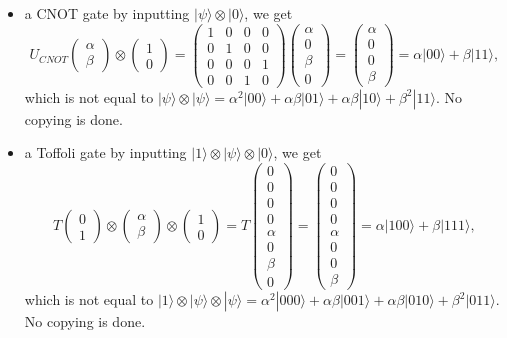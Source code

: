 \documentclass{article}
\theoremstyle{definition}
\begin{document}
\begin{itemize}
  \item a CNOT gate by inputting $|\psi \rangle \otimes |0\rangle$, we get
    \[U_{CNOT} \begin{pmatrix} \alpha \\ \beta \end{pmatrix} \otimes \begin{pmatrix} 1 \\ 0 \end{pmatrix} = \begin{pmatrix} 1&0&0&0\\0&1&0&0\\0&0&0&1\\0&0&1&0 \end{pmatrix} \begin{pmatrix} \alpha \\ 0 \\ \beta \\ 0 \end{pmatrix} = \begin{pmatrix} \alpha \\ 0 \\ 0 \\ \beta \end{pmatrix} = \alpha |00\rangle + \beta |11\rangle,\]
    which is not equal to $|\psi \rangle \otimes |\psi \rangle = \alpha^2 |00\rangle + \alpha \beta |01 \rangle + \alpha \beta |10 \rangle + \beta^2 |11 \rangle$. No copying is done.
  \item a Toffoli gate by inputting $|1\rangle \otimes |\psi \rangle \otimes |0\rangle$, we get
    \[T \begin{pmatrix} 0 \\ 1 \end{pmatrix} \otimes \begin{pmatrix} \alpha \\ \beta \end{pmatrix} \otimes \begin{pmatrix} 1 \\ 0 \end{pmatrix} = T \begin{pmatrix} 0\\0\\0\\0\\ \alpha \\ 0 \\ \beta \\ 0 \end{pmatrix} = \begin{pmatrix} 0\\0\\0\\0\\ \alpha \\ 0 \\ 0 \\ \beta \end{pmatrix} = \alpha |100\rangle + \beta |111\rangle,\]
    which is not equal to $|1\rangle \otimes |\psi \rangle \otimes |\psi\rangle = \alpha^2 |000\rangle + \alpha \beta |001 \rangle + \alpha \beta |010\rangle + \beta^2 |011\rangle$. No copying is done.
\end{itemize}
\end{document}
